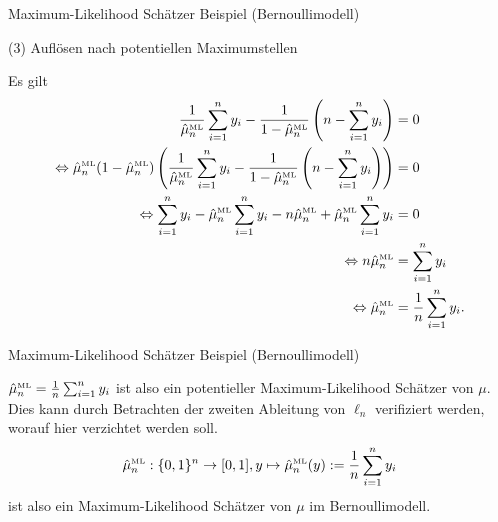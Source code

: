 \documentclass[
  8pt,
  ignorenonframetext,
]{beamer}
\begin{document}
\begin{frame}{Maximum-Likelihood Schätzer}
\protect\hypertarget{maximum-likelihood-schuxe4tzer-5}{}
Beispiel (Bernoullimodell)

\small

\noindent (3) Auflösen nach potentiellen Maximumstellen

\footnotesize

Es gilt \begin{align}
\begin{split}
\frac{1}{\hat{\mu}_{n}^{\mbox{\tiny ML}}}\sum_{i=1}^n y_i - \frac{1}{1-\hat{\mu}_{n}^{\mbox{\tiny ML}}} \left(n - \sum_{i=1}^n y_i \right) & = 0 \\
\Leftrightarrow
\hat{\mu}_{n}^{\mbox{\tiny ML}}(1 - \hat{\mu}_{n}^{\mbox{\tiny ML}})\left(\frac{1}{\hat{\mu}_{n}^{\mbox{\tiny ML}}}\sum_{i=1}^n y_i - \frac{1}{1-\hat{\mu}_{n}^{\mbox{\tiny ML}}} \left(n - \sum_{i=1}^n y_i \right) \right) & = 0 \\
\Leftrightarrow
\sum_{i=1}^n y_i - \hat{\mu}_{n}^{\mbox{\tiny ML}} \sum_{i=1}^n y_i - n \hat{\mu}_{n}^{\mbox{\tiny ML}}  + \hat{\mu}_{n}^{\mbox{\tiny ML}}\sum_{i=1}^n y_i & = 0 \\
\Leftrightarrow
n \hat{\mu}_{n}^{\mbox{\tiny ML}}  & = \sum_{i=1}^n y_i \\
\Leftrightarrow
\hat{\mu}_{n}^{\mbox{\tiny ML}}  & = \frac{1}{n} \sum_{i=1}^n y_i. \\
\end{split}
\end{align}
\end{frame}

\begin{frame}{Maximum-Likelihood Schätzer}
\protect\hypertarget{maximum-likelihood-schuxe4tzer-6}{}
Beispiel (Bernoullimodell) \vspace{2mm}

\small

\(\hat{\mu}_{n}^{\mbox{\tiny ML}} = \frac{1}{n}\sum_{i=1}^n y_i\) ist
also ein potentieller Maximum-Likelihood Schätzer von \(\mu\). Dies kann
durch Betrachten der zweiten Ableitung von \(\ell_n\) verifiziert
werden, worauf hier verzichtet werden soll. \begin{equation}
\hat{\mu}_{n}^{\mbox{\tiny ML}} : \{0,1\}^n \to [0,1],
y \mapsto \hat{\mu}_{n}^{\mbox{\tiny ML}}(y):= \frac{1}{n}\sum_{i=1}^n y_i
\end{equation} ist also ein Maximum-Likelihood Schätzer von \(\mu\) im
Bernoullimodell.
\end{frame}
\end{document}
